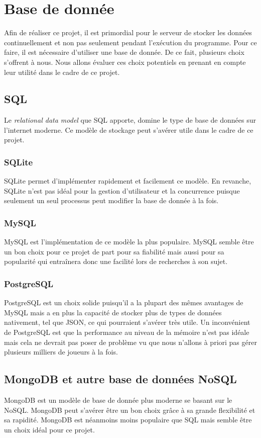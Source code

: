 \section{Base de donnée}
Afin de réaliser ce projet, il est primordial pour le serveur de stocker les données continuellement et non pas seulement pendant l'exécution du programme. Pour ce faire, il est nécessaire d'utiliser une base de donnée. De ce fait, plusieurs choix s'offrent à nous.
Nous allons évaluer ces choix potentiels en prenant en compte leur utilité dans le cadre de ce projet.

\subsection{SQL}
Le \textit{relational data model} que SQL apporte, domine le type de base de données sur l'internet moderne. Ce modèle de stockage peut s'avérer utile dans le cadre de ce projet.

\subsubsection{SQLite}
SQLite permet d'implémenter rapidement et facilement ce modèle. En revanche, SQLite n'est pas idéal pour la gestion d'utilisateur et la concurrence puisque seulement un seul processus peut modifier la base de donnée à la fois.

\subsubsection{MySQL}
MySQL est l'implémentation de ce modèle la plus populaire. MySQL semble être un bon choix pour ce projet de part pour sa fiabilité mais aussi pour sa popularité qui entraînera donc une facilité lors de recherches à son sujet.

\subsubsection{PostgreSQL}
PostgreSQL est un choix solide puisqu'il a la plupart des mêmes avantages de MySQL mais a en plus la capacité de stocker plus de types de données nativement, tel que JSON, ce qui pourraient s'avérer très utile. Un inconvénient de PostgreSQL est que la performance au niveau de la mémoire n'est pas idéale mais cela ne devrait pas poser de problème vu que nous n'allons à priori pas gérer plusieurs milliers de joueurs à la fois.

\subsection{MongoDB et autre base de données NoSQL}
MongoDB est un modèle de base de donnée plus moderne se basant sur le NoSQL. MongoDB peut s'avérer être un bon choix grâce à sa grande flexibilité et sa rapidité. MongoDB est néanmoins moins populaire que SQL mais semble être un choix idéal pour ce projet.

